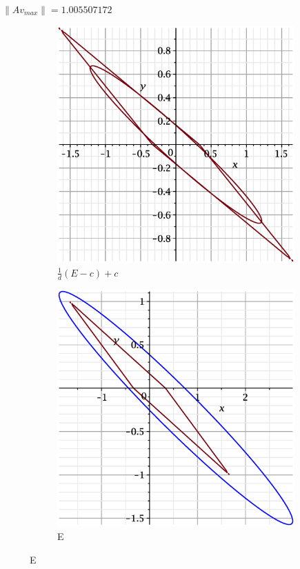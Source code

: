 \documentclass{beamer}
\begin{document}
\begin{frame}
$\|Av_{max}\| = 1.005507172$  
    \begin{figure}
    \begin{subfigure}{.5\textwidth}
        \centering
        \includegraphics[width=.8\linewidth]{pictures/7.eps}
        \caption{$\displaystyle\frac{1}{d}(E-c)+c$}
    \label{fig:sfig1}
    \end{subfigure}%
    \begin{subfigure}{.5\textwidth}
        \centering
        \includegraphics[width=.8\linewidth]{pictures/1_7.eps}
        \caption{E}
    \label{fig:sfig2}
    \end{subfigure}
\end{figure}

\end{frame}
\end{document}
